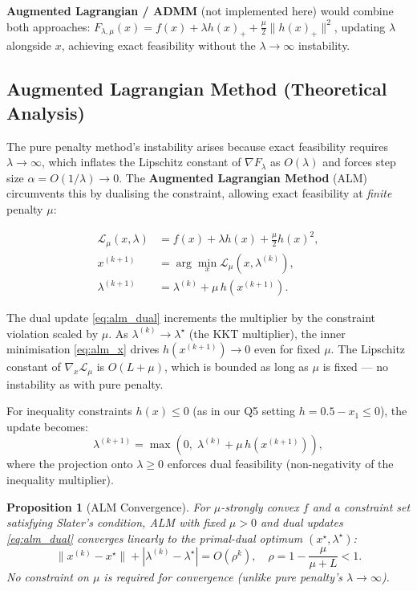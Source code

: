 \documentclass[11pt,a4paper]{article}
\newtheorem{proposition}[theorem]{Proposition}
\theoremstyle{definition}
\begin{document}
\textbf{Augmented Lagrangian / ADMM} (not implemented here) would combine both approaches: $F_{\lambda, \mu}(x) = f(x) + \lambda h(x)_+ + \frac{\mu}{2}\|h(x)_+\|^2$, updating $\lambda$ alongside $x$, achieving exact feasibility without the $\lambda \to \infty$ instability.

\subsection{Augmented Lagrangian Method (Theoretical Analysis)}

The pure penalty method's instability arises because exact feasibility requires $\lambda \to \infty$, which inflates the Lipschitz constant of $\nabla F_\lambda$ as $O(\lambda)$ and forces step size $\alpha = O(1/\lambda) \to 0$. The \textbf{Augmented Lagrangian Method} (ALM) circumvents this by dualising the constraint, allowing exact feasibility at \emph{finite} penalty $\mu$:

\begin{align}
\mathcal{L}_\mu(x, \lambda) &= f(x) + \lambda h(x) + \frac{\mu}{2} h(x)^2, \label{eq:alm}\\
x^{(k+1)} &= \arg\min_x \mathcal{L}_\mu(x, \lambda^{(k)}), \label{eq:alm_x}\\
\lambda^{(k+1)} &= \lambda^{(k)} + \mu\, h(x^{(k+1)}). \label{eq:alm_dual}
\end{align}

The dual update \eqref{eq:alm_dual} increments the multiplier by the constraint violation scaled by $\mu$. As $\lambda^{(k)} \to \lambda^{\star}$ (the KKT multiplier), the inner minimisation \eqref{eq:alm_x} drives $h(x^{(k+1)}) \to 0$ even for fixed $\mu$. The Lipschitz constant of $\nabla_x \mathcal{L}_\mu$ is $O(L + \mu)$, which is bounded as long as $\mu$ is fixed --- no instability as with pure penalty.

For inequality constraints $h(x) \leq 0$ (as in our Q5 setting $h = 0.5 - x_1 \leq 0$), the update becomes:
\begin{equation}
\lambda^{(k+1)} = \max\!\left(0,\; \lambda^{(k)} + \mu\, h(x^{(k+1)})\right),
\end{equation}
where the projection onto $\lambda \geq 0$ enforces dual feasibility (non-negativity of the inequality multiplier).

\begin{proposition}[ALM Convergence]
For $\mu$-strongly convex $f$ and a constraint set satisfying Slater's condition, ALM with fixed $\mu > 0$ and dual updates \eqref{eq:alm_dual} converges linearly to the primal-dual optimum $(x^{\star}, \lambda^{\star})$:
\begin{equation}
\|x^{(k)} - x^{\star}\| + |\lambda^{(k)} - \lambda^{\star}| = O(\rho^k), \quad \rho = 1 - \frac{\mu}{\mu + L} < 1.
\end{equation}
No constraint on $\mu$ is required for convergence (unlike pure penalty's $\lambda \to \infty$).
\end{proposition}
\end{document}

